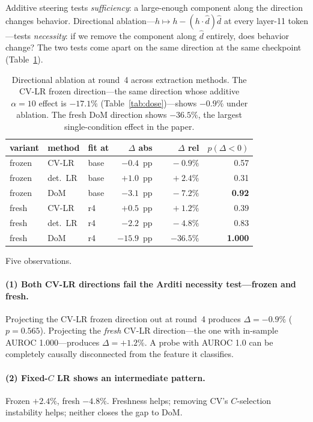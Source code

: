 \documentclass[11pt]{article}
\begin{document}
Additive steering tests \emph{sufficiency}: a large-enough component
along the direction changes behavior. Directional ablation---$h
\mapsto h - (h \cdot \hat d)\hat d$ at every layer-11 token---tests
\emph{necessity}: if we remove the component along $\hat d$ entirely,
does behavior change? The two tests come apart on the same direction
at the same checkpoint (Table~\ref{tab:ablation}).

\begin{table}[h]
\centering
\small
\begin{tabular}{ll l rrr}
\toprule
variant & method & fit at & $\Delta$ abs & $\Delta$ rel & $p(\Delta < 0)$ \\
\midrule
frozen & CV-LR          & base & $-0.4$~pp & $\phantom{+}-0.9\%$  & 0.57 \\
frozen & det.\ LR       & base & $+1.0$~pp & $\phantom{-}+2.4\%$  & 0.31 \\
frozen & DoM            & base & $-3.1$~pp & $\phantom{+}-7.2\%$  & \textbf{0.92} \\
fresh  & CV-LR          & r4   & $+0.5$~pp & $\phantom{-}+1.2\%$  & 0.39 \\
fresh  & det.\ LR       & r4   & $-2.2$~pp & $\phantom{+}-4.8\%$  & 0.83 \\
fresh  & DoM            & r4   & $-15.9$~pp & $\mathbf{-36.5\%}$  & \textbf{1.000} \\
\bottomrule
\end{tabular}
\caption{Directional ablation at round~4 across extraction methods.
The CV-LR frozen direction---the same direction whose additive
$\alpha{=}10$ effect is $-17.1\%$ (Table~\ref{tab:dose})---shows
$-0.9\%$ under ablation. The fresh DoM direction shows $-36.5\%$, the
largest single-condition effect in the paper.}
\label{tab:ablation}
\end{table}

Five observations.

\paragraph{(1) Both CV-LR directions fail the Arditi necessity test---frozen and fresh.}
Projecting the CV-LR frozen direction out at
round~4 produces $\Delta{=}-0.9\%$ ($p{=}0.565$). Projecting the
\emph{fresh} CV-LR direction---the one with in-sample AUROC
1.000---produces $\Delta{=}+1.2\%$. A probe with AUROC 1.0 can be
completely causally disconnected from the feature it classifies.

\paragraph{(2) Fixed-$C$ LR shows an intermediate pattern.} Frozen
$+2.4\%$, fresh $-4.8\%$. Freshness helps; removing CV's
$C$-selection instability helps; neither closes the gap to DoM.
\end{document}
